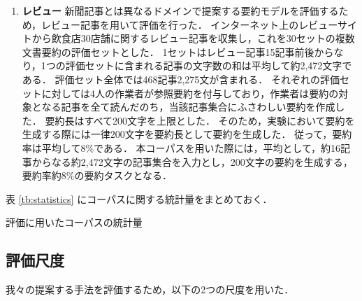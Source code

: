 \documentclass[japanese]{jnlp_1.4}
\begin{document}
\begin{enumerate}
\item {\bf レビュー}\hspace{1zw}
新聞記事とは異なるドメインで提案する要約モデルを評価するため，レビュー記事を用いて評価を行った．
インターネット上のレビューサイトから飲食店30店舗に関するレビュー記事を収集し，これを30セットの複数文書要約の評価セットとした．
1セットはレビュー記事15記事前後からなり，1つの評価セットに含まれる記事の文字数の和は平均して約2,472文字である．
評価セット全体では468記事2,275文が含まれる．
それぞれの評価セットに対しては4人の作業者が参照要約を付与しており，作業者は要約の対象となる記事を全て読んだのち，当該記事集合にふさわしい要約を作成した．
要約長はすべて200文字を上限とした．
そのため，実験において要約を生成する際には一律200文字を要約長として要約を生成した．
従って，要約率は平均して8\%である．
本コーパスを用いた際には，平均として，約16記事からなる約2,472文字の記事集合を入力とし，200文字の要約を生成する，要約率約8\%の要約タスクとなる．
\end{enumerate}

表 \ref{tb:statistics} にコーパスに関する統計量をまとめておく．

\begin{table}[t]
\caption{評価に用いたコーパスの統計量}
\label{tb:statistics}

\end{table}


\subsection{評価尺度}
\label{measures}

我々の提案する手法を評価するため，以下の2つの尺度を用いた．
\end{document}
